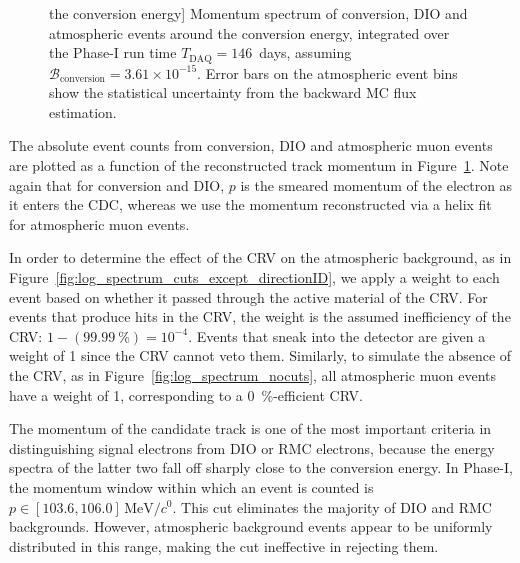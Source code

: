 \begin{figure}
    the conversion energy]{ Momentum spectrum of conversion, DIO and atmospheric
    events around the conversion energy, integrated over the Phase-I run time
    $T_\mathrm{DAQ} = 146$~days, assuming $\mathcal{B}_\mathrm{conversion} =
    3.61\times 10^{-15}$. Error bars on the atmospheric event bins show the
    statistical uncertainty from the backward MC flux estimation.
    }
    \label{fig:log_spectra}
\end{figure}


The absolute event counts from conversion, DIO and atmospheric muon events are
plotted as a function of the reconstructed track momentum in
Figure~\ref{fig:log_spectra}. Note again that for conversion and DIO, $p$ is the
smeared momentum of the electron as it enters the CDC, whereas we use the
momentum reconstructed via a helix fit for atmospheric muon events.


In order to determine the effect of the CRV on the atmospheric background, as in
Figure~\ref{fig:log_spectrum_cuts_except_directionID}, we apply a weight to each
event based on whether it passed through the active material of the CRV. For
events that produce hits in the CRV, the weight is the assumed inefficiency of
the CRV: $1 - (\SI{99.99}{\percent}) = 10^{-4}$. Events that sneak into the
detector are given a weight of 1 since the CRV cannot veto them. Similarly, to
simulate the absence of the CRV, as in Figure~\ref{fig:log_spectrum_nocuts}, all
atmospheric muon events have a weight of 1, corresponding to a
\SI{0}{\percent}-efficient CRV.







The momentum of the candidate track is one of the most important criteria in
distinguishing signal electrons from DIO or RMC
electrons, because the energy spectra of the latter two fall off sharply close
to the conversion energy. In Phase\nobreakdash-I, the momentum window within which an event
is counted is $p \in [103.6, 106.0]\,\si{\MeV/\clight}$. This cut eliminates the
majority of DIO and RMC backgrounds. However, atmospheric background events
appear to be uniformly distributed in this range, making the cut ineffective in
rejecting them. 

